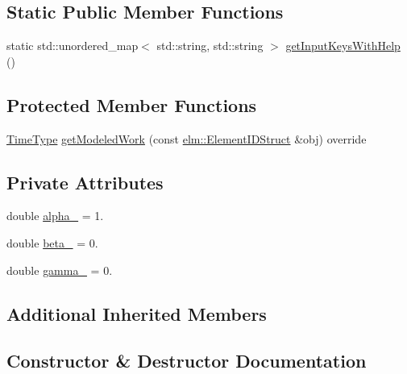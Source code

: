 \subsection*{Static Public Member Functions}
\begin{DoxyCompactItemize}
\item 
static std\+::unordered\+\_\+map$<$ std\+::string, std\+::string $>$ \hyperlink{structvt_1_1vrt_1_1collection_1_1lb_1_1_tempered_w_min_a30e2c27a7d127db53f268916fe8cbee2}{get\+Input\+Keys\+With\+Help} ()
\end{DoxyCompactItemize}
\subsection*{Protected Member Functions}
\begin{DoxyCompactItemize}
\item 
\hyperlink{namespacevt_a876a9d0cd5a952859c72de8a46881442}{Time\+Type} \hyperlink{structvt_1_1vrt_1_1collection_1_1lb_1_1_tempered_w_min_a54df52bb285e905a8994ff8fc9b1b349}{get\+Modeled\+Work} (const \hyperlink{structvt_1_1elm_1_1_element_i_d_struct}{elm\+::\+Element\+I\+D\+Struct} \&obj) override
\end{DoxyCompactItemize}
\subsection*{Private Attributes}
\begin{DoxyCompactItemize}
\item 
double \hyperlink{structvt_1_1vrt_1_1collection_1_1lb_1_1_tempered_w_min_a3c73a78b96830428d3f87b5f930ebef5}{alpha\+\_\+} = 1.
\item 
double \hyperlink{structvt_1_1vrt_1_1collection_1_1lb_1_1_tempered_w_min_abce8c16e0a7656a9df933f54ce7d2256}{beta\+\_\+} = 0.
\item 
double \hyperlink{structvt_1_1vrt_1_1collection_1_1lb_1_1_tempered_w_min_abfdd0a558d47f9e31f8645fc703479db}{gamma\+\_\+} = 0.
\end{DoxyCompactItemize}
\subsection*{Additional Inherited Members}


\subsection{Constructor \& Destructor Documentation}
\mbox{\label{structvt_1_1vrt_1_1collection_1_1lb_1_1_tempered_w_min_a0651609fa1544383a93ef8c178be4780}} 
